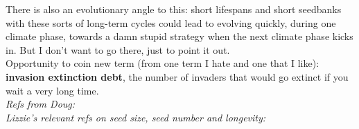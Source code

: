 \documentclass[11pt,a4paper,oneside]{article}
\begin{document}
There is also an evolutionary angle to this: short lifespans and short seedbanks with these sorts of long-term cycles could lead to evolving quickly, during one climate phase, towards a damn stupid strategy when the next climate phase kicks in. But I don't want to go there, just to point it out.\\

\noindent Opportunity to coin new term (from one term I hate and one that I like): {\bf invasion extinction debt}, the number of invaders that would go extinct if you wait a very long time. \\

\noindent \emph{Refs from Doug:} \citep{Davison2010,morris2008,Tuljapurkar2009}\\

\noindent \emph{Lizzie's relevant refs on seed size, seed number and longevity:} \citep{moleswest2006,rees2009,saatkamp2009,silvertown1981,thompson1987,venable1988}\\


\newpage


\end{document}
